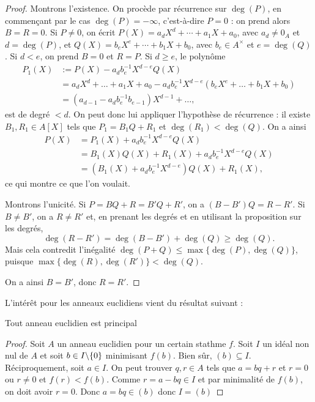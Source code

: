 \documentclass[]{report}
\begin{document}
\begin{proof}{}{}
    Montrons l'existence. On procède par récurrence sur $\deg(P)$, en commençant par le cas $\deg(P) = -\infty$, c'est-à-dire $P = 0$ : on prend alors $B = R = 0$. Si $P \neq 0$, on écrit $P(X) = a_d X^d + \cdots + a_1 X + a_0$, avec $a_d \neq 0_A$ et $d = \deg(P)$, et $Q(X) = b_e X^e + \cdots + b_1 X + b_0$, avec $b_e \in A^{\times}$ et $e = \deg(Q)$. Si $d < e$, on prend $B = 0$ et $R = P$. Si $d \ge e$, le polynôme
    \begin{align*}
    P_1(X) & := P(X) - a_d b_e^{-1} X^{d-e} Q(X)\\
    & = a_d X^d + \dots + a_1 X + a_0 - a_d b_e^{-1} X^{d-e} (b_e X^e + \dots + b_1 X + b_0)\\
    & = (a_{d-1} - a_d b_e^{-1} b_{e-1}) X^{d-1} + \dots,
    \end{align*}
    est de degré $< d$. On peut donc lui appliquer l'hypothèse de récurrence : il existe $B_1, R_1 \in A[X]$ tels que $P_1 = B_1 Q + R_1$ et $\deg(R_1) < \deg(Q)$. On a ainsi
    \begin{align*}
    P(X) & = P_1(X) + a_d b_e^{-1} X^{d-e} Q(X)\\
    & = B_1(X) Q(X) + R_1(X) + a_d b_e^{-1} X^{d-e} Q(X)\\
    & = (B_1(X) + a_d b_e^{-1} X^{d-e}) Q(X) + R_1(X),
    \end{align*}
    ce qui montre ce que l'on voulait.

    Montrons l'unicité. Si $P = BQ + R = B'Q + R'$, on a $(B - B')Q = R - R'$. Si $B \neq B'$, on a $R \neq R'$ et, en prenant les degrés et en utilisant la proposition sur les degrés,
    \[\deg(R - R') = \deg(B - B') + \deg(Q) \ge \deg(Q).\]
    Mais cela contredit l'inégalité $\deg(P + Q) \le \max\{\deg(P), \deg(Q)\}$, puisque $\max\{\deg(R), \deg(R')\} < \deg(Q)$.

    On a ainsi $B = B'$, donc $R = R'$.
\end{proof}

L'intérêt pour les anneaux euclidiens vient du résultat suivant :

\begin{tm}{}{}
    Tout anneau euclidien est principal
\end{tm}

\begin{proof}{}{}
    Soit $A$ un anneau euclidien pour un certain stathme $f$. Soit $I$ un idéal non nul de $A$ et soit $b\in I\backslash \{0\}$ minimisant $f(b)$. Bien sûr, $(b)\subseteq I$. Réciproquement, soit $a\in I$. On peut trouver $q,r\in A$ tels que $a=bq+r$ et $r=0$ ou $r\neq 0$ et $f(r)<f(b)$. Comme $r=a-bq\in I$ et par minimalité de $f(b)$, on doit avoir $r=0$. Donc $a=bq\in (b)$ donc $I=(b)$
\end{proof}
\end{document}
